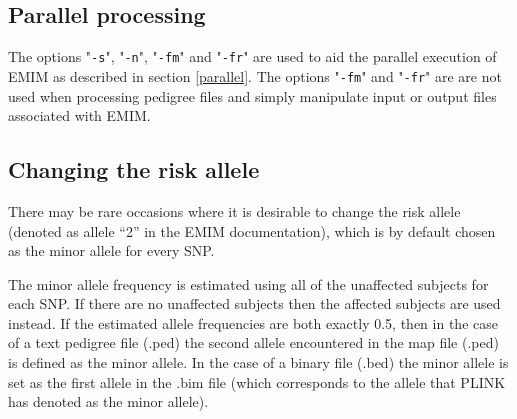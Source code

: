 \documentclass[a4paper,12pt]{article}
\newcommand{\code}[1]{{\footnotesize{{\tt #1}}}}
\begin{document}



\subsection{Parallel processing}
\label{premim-parallel}

The options "\code{-s}", "\code{-n}", "\code{-fm}" and "\code{-fr}" are used to aid the parallel execution of EMIM as described in  section \ref{parallel}. The options "\code{-fm}" and "\code{-fr}" are are not used when processing pedigree files and simply manipulate input or output files associated with EMIM. 


\subsection{Changing the risk allele}
\label{risk-allele}

There may be rare occasions where it is desirable to change the risk allele (denoted as allele ``2'' in the EMIM documentation), which is by default chosen as the minor allele for every SNP. 

The minor allele frequency is estimated using all of the unaffected subjects for each SNP. If there are no unaffected subjects then the affected subjects are used instead. If the estimated allele frequencies are both exactly 0.5, then in the case of a text pedigree file (.ped) the second allele encountered in the map file (.ped) is defined as the minor allele. In the case of a binary file (.bed) the minor allele is set as the first allele in the .bim file (which corresponds to the allele that PLINK has denoted as the minor allele). 
\end{document}
